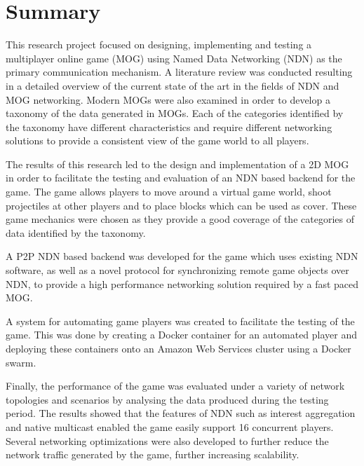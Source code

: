 \chapter*{Summary}
This research project focused on designing, implementing and testing a multiplayer online game (MOG) using Named Data Networking (NDN) as the primary communication mechanism. A literature review was conducted resulting in a detailed overview of the current state of the art in the fields of NDN and MOG networking. Modern MOGs were also examined in order to develop a taxonomy of the data generated in MOGs. Each of the categories identified by the taxonomy have different characteristics and require different networking solutions to provide a consistent view of the game world to all players. 

The results of this research led to the design and implementation of a 2D MOG in order to facilitate the testing and evaluation of an NDN based backend for the game. The game allows players to move around a virtual game world, shoot projectiles at other players and to place blocks which can be used as cover. These game mechanics were chosen as they provide a good coverage of the categories of data identified by the taxonomy. 

A P2P NDN based backend was developed for the game which uses existing NDN software, as well as a novel protocol for synchronizing remote game objects over NDN, to provide a high performance networking solution required by a fast paced MOG.

A system for automating game players was created to facilitate the testing of the game. This was done by creating a Docker container for an automated player and deploying these containers onto an Amazon Web Services cluster using a Docker swarm.  

Finally, the performance of the game was evaluated under a variety of network topologies and scenarios by analysing the data produced during the testing period. The results showed that the features of NDN such as interest aggregation and native multicast enabled the game easily support 16 concurrent players. Several networking optimizations were also developed to further reduce the network traffic generated by the game, further increasing scalability.
